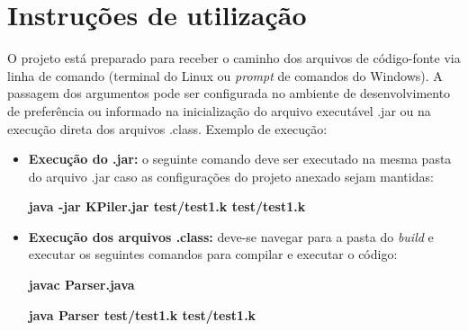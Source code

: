 \chapter[Instruções de utilização]{Instruções de utilização}
\label{cap:instrucoes}

O projeto está preparado para receber o caminho dos arquivos de código-fonte via linha de comando (terminal do Linux ou \textit{prompt} de comandos do Windows). A passagem dos argumentos pode ser configurada no ambiente de desenvolvimento de preferência ou informado na inicialização do arquivo executável .jar ou na execução direta dos arquivos .class. Exemplo de execução:

\begin{itemize}
    \item \textbf{Execução do .jar:} o seguinte comando deve ser executado na mesma pasta do arquivo .jar caso as configurações do projeto anexado sejam mantidas:
    
    \begin{center}
        \textbf{java -jar KPiler.jar test/test1.k test/test1.k}
    \end{center}

    \item \textbf{Execução dos arquivos .class:} deve-se navegar para a pasta do \textit{build} e executar os seguintes comandos para compilar e executar o código:
    
    \begin{center}
        \textbf{javac Parser.java}
        
        \textbf{java Parser test/test1.k test/test1.k}
    \end{center}

\end{itemize}


